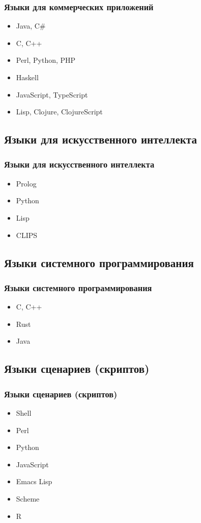\documentclass[9pt,pdf]{beamer}
\begin{document}
\begin{frame}
	\frametitle{Языки для коммерческих приложений}
	\begin{itemize}
		\item Java, C\#
		\item C, C++
		\item Perl, Python, PHP
		\item Haskell
		\item JavaScript, TypeScript
		\item Lisp, Clojure, ClojureScript
	\end{itemize}
\end{frame}

\subsection{Языки для искусственного интеллекта}

\begin{frame}
	\frametitle{Языки для искусственного интеллекта}
	\begin{itemize}
		\item Prolog
		\item Python
		\item Lisp
		\item CLIPS
	\end{itemize}
\end{frame}

\subsection{Языки системного программирования}

\begin{frame}
	\frametitle{Языки системного программирования}
	\begin{itemize}
		\item C, C++
		\item Rust
		\item Java
	\end{itemize}
\end{frame}

\subsection{Языки сценариев (скриптов)}

\begin{frame}
	\frametitle{Языки сценариев (скриптов)}
	\begin{itemize}
		\item Shell
		\item Perl
		\item Python
		\item JavaScript
		\item Emacs Lisp
		\item Scheme
		\item R
	\end{itemize}
\end{frame}
\end{document}

